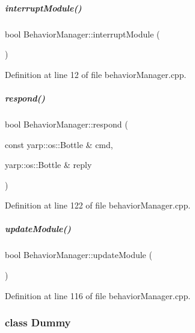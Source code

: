 \mbox{\label{group__behaviorManager_a892731d599c983a1a5b16d6fde6a1a38}} 
\subparagraph{\texorpdfstring{interrupt\+Module()}{interruptModule()}}
{\footnotesize\ttfamily bool Behavior\+Manager\+::interrupt\+Module (\begin{DoxyParamCaption}{ }\end{DoxyParamCaption})}



Definition at line 12 of file behavior\+Manager.\+cpp.

\mbox{\label{group__behaviorManager_a79cbdf143299a44a1c391e385846bb04}} 
\subparagraph{\texorpdfstring{respond()}{respond()}}
{\footnotesize\ttfamily bool Behavior\+Manager\+::respond (\begin{DoxyParamCaption}\item[{const yarp\+::os\+::\+Bottle \&}]{cmd,  }\item[{yarp\+::os\+::\+Bottle \&}]{reply }\end{DoxyParamCaption})}



Definition at line 122 of file behavior\+Manager.\+cpp.

\mbox{\label{group__behaviorManager_ad46e6bb61e754f6a33e73ac3ce656fbb}} 
\subparagraph{\texorpdfstring{update\+Module()}{updateModule()}}
{\footnotesize\ttfamily bool Behavior\+Manager\+::update\+Module (\begin{DoxyParamCaption}{ }\end{DoxyParamCaption})}



Definition at line 116 of file behavior\+Manager.\+cpp.

\label{classDummy}
\subsubsection{class Dummy}



